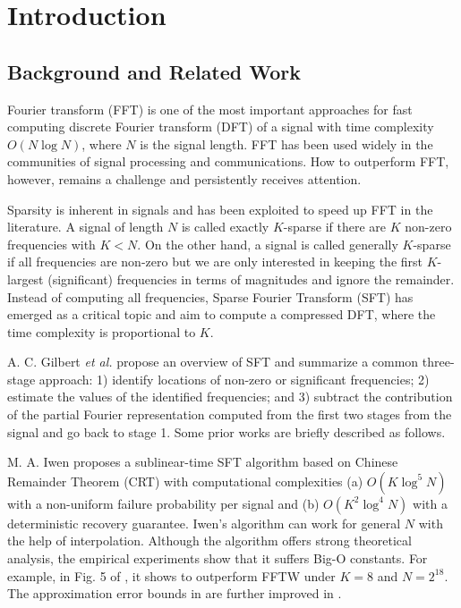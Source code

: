 \documentclass[journal,onecolumn,11pt]{IEEEtran}
\begin{document}
\section{Introduction}\label{sec:intro}
\subsection{Background and Related Work}
 Fourier transform (FFT) is one of the most important approaches for fast computing discrete Fourier transform (DFT) of a signal with time complexity $O(N \log N)$, where $N$ is the signal length.
FFT has been used widely in the communities of signal processing and communications.
How to outperform FFT, however, remains a challenge and persistently receives attention.

Sparsity is inherent in signals and has been exploited to speed up FFT in the literature.
A signal of length $N$ is called exactly $K$-sparse if there are $K$ non-zero frequencies with $K < N$.
On the other hand, a signal is called generally $K$-sparse if all frequencies are non-zero but we are only interested in keeping the first $K$-largest (significant) frequencies in terms of magnitudes and ignore the remainder.
Instead of computing all frequencies, Sparse Fourier Transform (SFT) has emerged as a critical topic and aim to compute a compressed DFT, where the time complexity is proportional to $K$.

A. C. Gilbert \cite{Gilbert2014} {\em et al.} propose an overview of SFT and summarize a common three-stage approach:
1) identify locations of non-zero or significant frequencies;
2) estimate the values of the identified frequencies; and
3) subtract the contribution of the partial Fourier representation computed from the first two stages from the signal and go back to stage 1.
Some prior works are briefly described as follows.

M. A. Iwen \cite{Iwen2010} proposes a sublinear-time SFT algorithm based on Chinese Remainder Theorem (CRT) with computational complexities
(a) $O(K \log^{5} N)$ with a non-uniform failure probability per signal and
(b) $O(K^2 \log^4 N)$ with a deterministic recovery guarantee.
Iwen's algorithm can work for general $N$ with the help of interpolation.
Although the algorithm offers strong theoretical analysis, the empirical experiments show that it suffers Big-O constants. For example, in Fig. 5 of \cite{Iwen2010}, it shows to outperform FFTW under $K=8$ and $N=2^{18}$.
The approximation error bounds in \cite{Iwen2010} are further improved in \cite{Iwen2013}.
\end{document}
